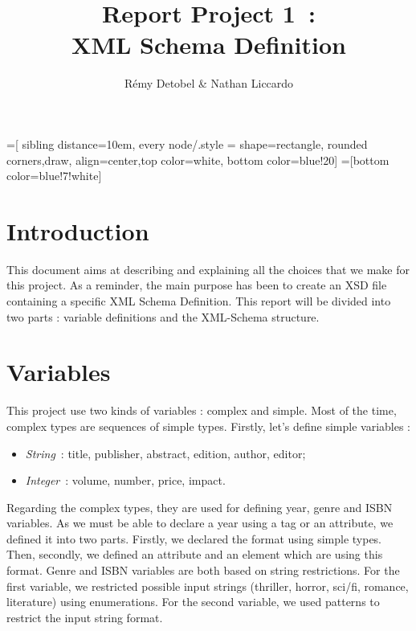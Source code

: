 \documentclass{article}
\author{R\'emy Detobel \& Nathan Liccardo}
\title{Report Project 1~:\\XML Schema Definition}
\begin{document}
=[
  sibling distance=10em,
  every node/.style = {shape=rectangle, rounded corners,draw, align=center,top color=white, bottom color=blue!20}]
=[bottom color=blue!7!white]

\maketitle

\section{Introduction}
This document aims at describing and explaining all the choices that we make for this project. As a reminder, the main purpose has been to create an XSD file containing a specific XML Schema Definition. This report will be divided into two parts : variable definitions and the XML-Schema structure. 
\section{Variables}
  \label{sec:variables}
This project use two kinds of variables : complex and simple. Most of the time, complex types are sequences of simple types. Firstly, let's define simple variables :  
  \begin{itemize}
    \item \textit{String}~: title, publisher, abstract, edition, author, editor;
    \item \textit{Integer}~: volume, number, price, impact.
  \end{itemize}
Regarding the complex types, they are used for defining year, genre and ISBN variables. As we must be able to declare a year using a tag or an attribute, we defined it into two parts. Firstly, we declared the format using simple types. Then, secondly, we defined an attribute and an element which are using this format. Genre and ISBN variables are both based on string restrictions. For the first variable, we restricted possible input strings (thriller, horror, sci/fi, romance, literature) using enumerations. For the second variable, we used patterns to restrict the input string format.
  
\end{document}
